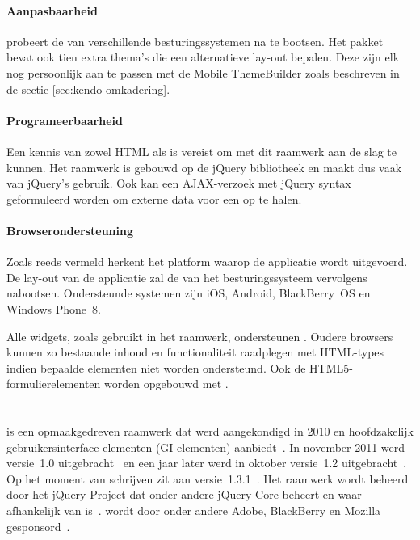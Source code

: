 \paragraph{Aanpasbaarheid}
\kendo{} probeert de  van verschillende besturingssystemen na te bootsen.
Het \kendo{} pakket bevat ook tien extra thema's die een alternatieve lay-out bepalen.
Deze zijn elk nog persoonlijk aan te passen met de Mobile ThemeBuilder zoals beschreven in de sectie \ref{sec:kendo-omkadering}.

\paragraph{Programeerbaarheid}
Een kennis van zowel HTML als \js{} is vereist om met dit raamwerk aan de slag te kunnen.
Het raamwerk is gebouwd op de jQuery bibliotheek en maakt dus vaak van jQuery's  gebruik.
Ook kan een AJAX-verzoek met jQuery syntax geformuleerd worden om externe data voor een  op te halen.

\paragraph{Browserondersteuning}
Zoals reeds vermeld herkent \kendo{} het platform waarop de applicatie wordt uitgevoerd.
De lay-out van de applicatie zal de  van het besturingssysteem vervolgens nabootsen.
Ondersteunde systemen zijn iOS, Android, BlackBerry~OS en Windows Phone~8.

Alle widgets, zoals gebruikt in het raamwerk, ondersteunen .
Oudere browsers kunnen zo bestaande inhoud en functionaliteit raadplegen met  HTML-types indien bepaalde elementen niet worden ondersteund.
Ook de HTML5-formulierelementen worden opgebouwd met .


\section{\jqm}
\label{sec:raamwerk-jqm}
\jqm{} is een opmaakgedreven raamwerk dat werd aangekondigd in 2010 en hoofdzakelijk gebruikersinterface-elementen (GI-elementen) aanbiedt~\cite{Resig2010}.
In november 2011 werd versie~1.0 uitgebracht~\cite{Parker2011} en een jaar later werd in oktober versie~1.2 uitgebracht~\cite{Parker2012}. 
Op het moment van schrijven zit \jqm{} aan versie~1.3.1~\cite{Parker2013b}. 
Het raamwerk wordt beheerd door het jQuery Project dat onder andere jQuery Core beheert en waar \jqm{} afhankelijk van is~\cite{JQuery2012}. 
\jqm{} wordt door onder andere Adobe, BlackBerry en Mozilla gesponsord~\cite{JQuery2012a}.

